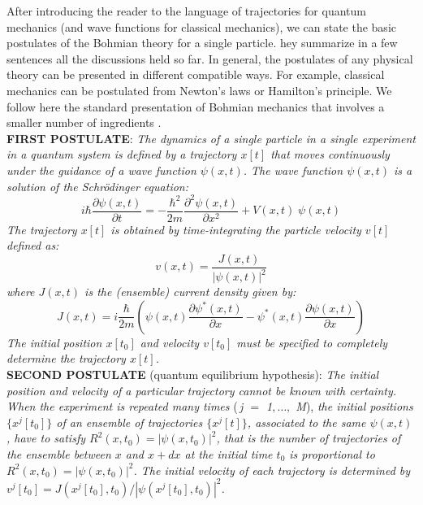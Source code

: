 \documentclass[nofootinbib, secnumarabic, amsmath, nobibnotes,10pt,aps,pra]{revtex4-1}
\begin{document}
After introducing the reader to the language of trajectories for
quantum mechanics (and wave functions for classical mechanics), we
can state the basic postulates of the Bohmian theory  for a single particle. hey summarize in a few sentences all the discussions held so far. In general, the
postulates of any physical theory can be presented in different
compatible ways. For example, classical mechanics can be postulated
from Newton's laws or Hamilton's principle. We follow here the
standard presentation of Bohmian mechanics that involves a smaller
number of ingredients
\cite{om.Holand1993,om.Valentini2006,om.Bohmian1996,om.Durrllibre,om.reviewabc,om.llibreph}.\\

\noindent\textbf{FIRST POSTULATE}: \textit{The dynamics of a single particle in a single experiment in a quantum system is defined by a trajectory $x[t]$ that moves continuously under the guidance of a wave function $\psi(x,t)$.
The wave function $\psi(x,t)$ is a solution of the Schr\"odinger equation:}
\begin{equation*}
i \hbar \frac{\partial \psi(x,t)} {\partial t} = -\frac {\hbar^2} {2m} \frac{ {\partial}^2 \psi(x,t)} {\partial x^2} + V(x,t) \;\psi(x,t)
\end{equation*}
\textit{The trajectory $x[t]$ is obtained by time-integrating the particle velocity $v[t]$ defined as:}
\begin{equation*}
v(x,t) = \frac{J(x,t)} {|\psi(x,t)|^2}
\end{equation*}
\textit{where $J(x,t)$ is the (ensemble) current density given by:}
\begin{equation*}
J(x,t) = i \frac {\hbar} {2 m} \left(\psi(x,t) \frac {\partial \psi^{*}(x,t)} {\partial x}- \psi^{*}(x,t) \frac {\partial \psi(x,t)} {\partial x} \right)
\end{equation*}
\textit{The initial position $x[t_0]$ and velocity $v[t_0]$ must be specified to completely determine the trajectory $x[t]$.} \\

\noindent\textbf{SECOND POSTULATE} (quantum equilibrium hypothesis): \textit{The initial position and velocity of a particular trajectory cannot be known with certainty. When the experiment is repeated many times}  (\textit{\,j $=$ 1$,\ldots,$ M}), \textit{the initial positions $\{ x^j[t_0] \}$ of an ensemble of trajectories $\{x^j[t] \}$, associated to the same $\psi(x,t)$, have to satisfy $R^2(x,t_0) = |\psi(x,t_0)|^2$, that is the number of trajectories of the ensemble between $x$ and $x + dx$ at the initial time $t_0$ is proportional to $R^2(x,t_0) = |\psi(x,t_0)|^2$. The initial velocity of each trajectory is determined by $v^j[t_0] = J(x^j[t_0],t_0)/|\psi(x^j[t_0],t_0)|^2$.}\\
\end{document}
